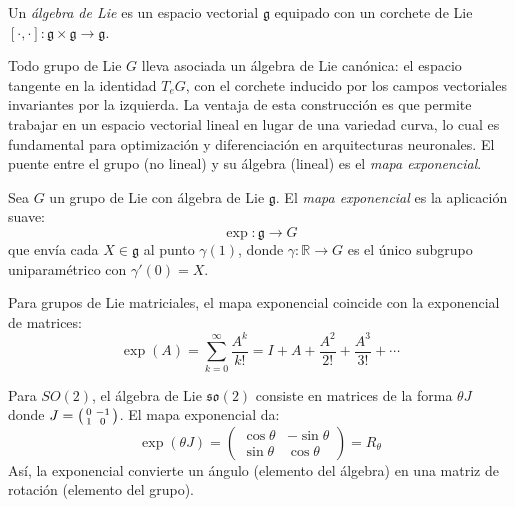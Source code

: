 \begin{definition}\label{def:algebra_lie}
Un \textit{álgebra de Lie} es un espacio vectorial $\mathfrak{g}$ equipado con un corchete de Lie $[\cdot, \cdot]: \mathfrak{g} \times \mathfrak{g} \to \mathfrak{g}$.
\end{definition}

Todo grupo de Lie $G$ lleva asociada un álgebra de Lie canónica: el espacio tangente en la identidad $T_e G$, con el corchete inducido por los campos vectoriales invariantes por la izquierda. La ventaja de esta construcción es que permite trabajar en un espacio vectorial lineal en lugar de una variedad curva, lo cual es fundamental para optimización y diferenciación en arquitecturas neuronales. El puente entre el grupo (no lineal) y su álgebra (lineal) es el \textit{mapa exponencial}.

\begin{definition}\label{def:mapa_exponencial}
Sea $G$ un grupo de Lie con álgebra de Lie $\mathfrak{g}$. El \textit{mapa exponencial} es la aplicación suave:
\begin{equation}
\exp: \mathfrak{g} \rightarrow G
\end{equation}
que envía cada $X \in \mathfrak{g}$ al punto $\gamma(1)$, donde $\gamma: \mathbb{R} \rightarrow G$ es el único subgrupo uniparamétrico con $\gamma'(0) = X$.
\end{definition}

Para grupos de Lie matriciales, el mapa exponencial coincide con la exponencial de matrices:
\begin{equation}
\exp(A) = \sum_{k=0}^{\infty} \frac{A^k}{k!} = I + A + \frac{A^2}{2!} + \frac{A^3}{3!} + \cdots
\end{equation}

\begin{example}\label{ex:mapa_exp_so2}
Para $SO(2)$, el álgebra de Lie $\mathfrak{so}(2)$ consiste en matrices de la forma $\theta J$ donde $J = \begin{psmallmatrix} 0 & -1 \\ 1 & 0 \end{psmallmatrix}$. El mapa exponencial da:
\begin{equation}
\exp(\theta J) = \begin{pmatrix} \cos\theta & -\sin\theta \\ \sin\theta & \cos\theta \end{pmatrix} = R_\theta
\end{equation}
Así, la exponencial convierte un ángulo (elemento del álgebra) en una matriz de rotación (elemento del grupo).
\end{example}

